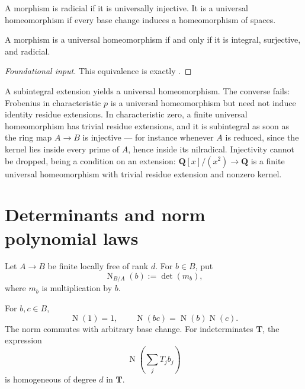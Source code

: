\begin{definition}
\label{def:appA-universal-homeomorphism}
A morphism is radicial if it is universally injective.  It is a universal
homeomorphism if every base change induces a homeomorphism of spaces.
\end{definition}

\begin{theorem}\label{thm:appA-universal-homeomorphism-criterion}
A morphism is a universal homeomorphism if and only if it is integral,
surjective, and radicial.
\end{theorem}

\begin{proof}[Foundational input]
This equivalence is exactly
\cite[\href{https://stacks.math.columbia.edu/tag/04DF}{Tag 04DF}]
{stacks-project}.
\end{proof}

\begin{remark}
\label{rem:appA-subintegral-stronger}
A subintegral extension yields a universal homeomorphism.  The converse
fails: Frobenius in characteristic \(p\) is a universal homeomorphism but
need not induce identity residue extensions.  In characteristic zero, a
finite universal homeomorphism has trivial residue extensions, and it is
subintegral as soon as the ring map \(A\to B\) is injective --- for
instance whenever \(A\) is reduced, since the kernel lies inside every
prime of \(A\), hence inside its nilradical.  Injectivity cannot be dropped,
being a condition on an extension: \(\mathbf Q[x]/(x^2)\to\mathbf Q\) is a
finite universal homeomorphism with trivial residue extension and nonzero
kernel.
\end{remark}

\section{Determinants and norm polynomial laws}
\label{sec:appA-determinant-norms}

Let \(A\to B\) be finite locally free of rank \(d\).  For \(b\in B\), put
\[
 \operatorname N_{B/A}(b):=\det(m_b),
\tag{A.8}\label{eq:appA-element-norm}
\]
where \(m_b\) is multiplication by \(b\).

\begin{proposition}\label{prop:appA-norm-identities}
For \(b,c\in B\),
\[
 \operatorname N(1)=1,\qquad
 \operatorname N(bc)=\operatorname N(b)\operatorname N(c).
\]
The norm commutes with arbitrary base change.  For indeterminates
\(\mathbf T\), the expression
\[
 \operatorname N\left(\sum_jT_jb_j\right)
\]
is homogeneous of degree \(d\) in \(\mathbf T\).
\end{proposition}

